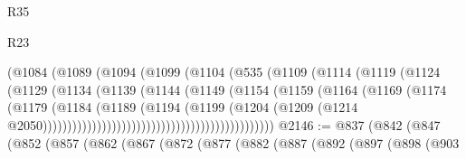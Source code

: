 \begin{lexlean}{R35}
\begin{lexlean}{R23}
\begin{coremodule}
{{{{{{{{{{{{{{{{{{{{{                                          (@1084
                                            (@1089
                                              (@1094
                                                (@1099
                                                  (@1104
                                                    (@535
                                                      (@1109
                                                        (@1114
                                                          (@1119
                                                            (@1124
                                                              (@1129
                                                                (@1134
                                                                  (@1139
                                                                    (@1144
                                                                      (@1149
                                                                        (@1154
                                                                          (@1159
                                                                            (@1164
                                                                              (@1169
                                                                                (@1174
                                                                                  (@1179
                                                                                    (@1184
                                                                                      (@1189
                                                                                        (@1194
                                                                                          (@1199
                                                                                            (@1204
                                                                                              (@1209
                                                                                                (@1214
                                                                                                  @2050)))))))))))))))))))))))))))))))))))))))))))))))
@2146 := @837
    (@842
      (@847
        (@852
          (@857
            (@862
              (@867
                (@872
                  (@877
                    (@882
                      (@887
                        (@892
                          (@897
                            (@898
                              (@903
}}}}}}}}}}}}}}}}}}}}}
\end{coremodule}
\end{lexlean}
\end{lexlean}
